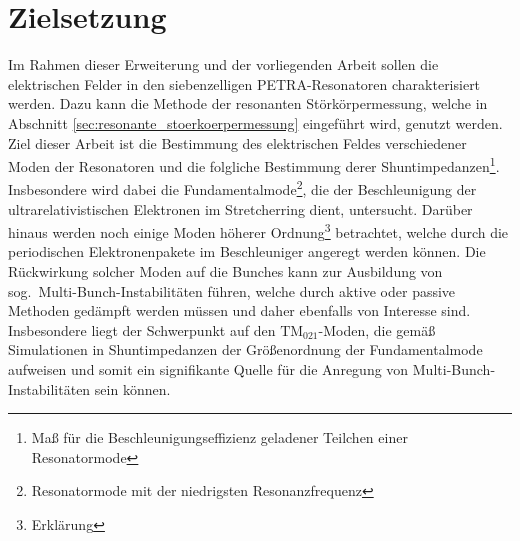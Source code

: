 \section{Zielsetzung}
Im Rahmen dieser Erweiterung und der vorliegenden Arbeit sollen die elektrischen Felder in den siebenzelligen PETRA-Resonatoren charakterisiert werden.
Dazu kann die Methode der resonanten Störkörpermessung, welche in Abschnitt \ref{sec:resonante_stoerkoerpermessung} eingeführt wird, genutzt werden.
Ziel dieser Arbeit ist die Bestimmung des elektrischen Feldes verschiedener Moden der Resonatoren und die folgliche Bestimmung derer Shuntimpedanzen\footnote{Maß für die Beschleunigungseffizienz geladener Teilchen einer Resonatormode}.
Insbesondere wird dabei die Fundamentalmode\footnote{Resonatormode mit der niedrigsten Resonanzfrequenz}, die der Beschleunigung der ultrarelativistischen Elektronen im Stretcherring dient, untersucht.
Darüber hinaus werden noch einige Moden höherer Ordnung\footnote{Erklärung} betrachtet, welche durch die periodischen Elektronenpakete im Beschleuniger angeregt werden können.
Die Rückwirkung solcher Moden auf die Bunches kann zur Ausbildung von sog.\ Multi-Bunch-Instabilitäten führen, welche durch aktive oder passive Methoden gedämpft werden müssen und daher ebenfalls von Interesse sind.
Insbesondere liegt der Schwerpunkt auf den $\mathrm{TM}_{021}$-Moden, die gemäß Simulationen in \cite{schedler} Shuntimpedanzen der Größenordnung der Fundamentalmode aufweisen und somit ein signifikante Quelle für die Anregung von Multi-Bunch-Instabilitäten sein können.

